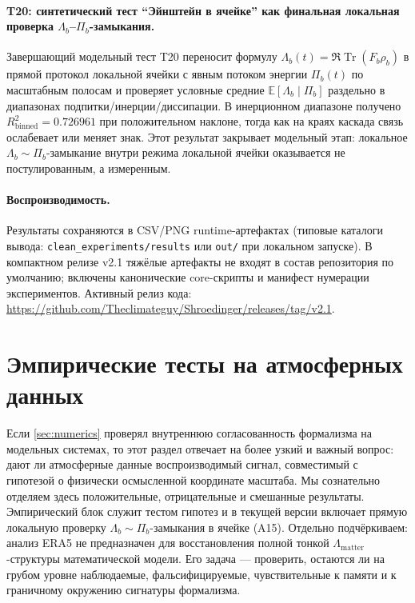 \documentclass[11pt,a4paper]{article}
\DeclareMathOperator{\Tr}{Tr}
\theoremstyle{definition}
\theoremstyle{plain}
\theoremstyle{remark}
\begin{document}
\paragraph{T20: синтетический тест ``Эйнштейн в ячейке'' как финальная локальная проверка $\Lambda_b$--$\Pi_b$-замыкания.}
Завершающий модельный тест T20 переносит формулу \(\Lambda_b(t)=\Re\Tr(F_b\rho_b)\) в прямой протокол локальной ячейки
с явным потоком энергии \(\Pi_b(t)\) по масштабным полосам и проверяет условные средние
\(\mathbb E[\Lambda_b\mid \Pi_b]\) раздельно в диапазонах подпитки/инерции/диссипации.
В инерционном диапазоне получено
\(R^2_{\mathrm{binned}}=0.726961\) при положительном наклоне, тогда как на краях каскада
связь ослабевает или меняет знак.
Этот результат закрывает модельный этап: локальное \(\Lambda_b\sim\Pi_b\)-замыкание
внутри режима локальной ячейки оказывается не постулированным, а измеренным.

\paragraph{Воспроизводимость.}
Результаты сохраняются в CSV/PNG runtime-артефактах (типовые каталоги вывода:
\texttt{clean\_experiments/results} или \texttt{out/} при локальном запуске).
В компактном релизе v2.1 тяжёлые артефакты не входят в состав репозитория по умолчанию;
включены канонические core-скрипты и манифест нумерации экспериментов.
Активный релиз кода:
\url{https://github.com/Theclimateguy/Shroedinger/releases/tag/v2.1}.

\section{Эмпирические тесты на атмосферных данных}
\label{sec:macro}

Если \cref{sec:numerics} проверял внутреннюю согласованность формализма на модельных системах,
то этот раздел отвечает на более узкий и важный вопрос: дают ли атмосферные данные воспроизводимый сигнал,
совместимый с гипотезой о физически осмысленной координате масштаба.
Мы сознательно отделяем здесь положительные, отрицательные и смешанные результаты.
Эмпирический блок служит тестом гипотез и в текущей версии включает прямую локальную проверку \(\Lambda_b\sim\Pi_b\)-замыкания в ячейке (A15).
Отдельно подчёркиваем: анализ ERA5 не предназначен для восстановления полной тонкой $\Lambda_{\mathrm{matter}}$-структуры математической модели.
Его задача --- проверить, остаются ли на грубом уровне наблюдаемые, фальсифицируемые, чувствительные к памяти и к граничному окружению сигнатуры формализма.
\end{document}
